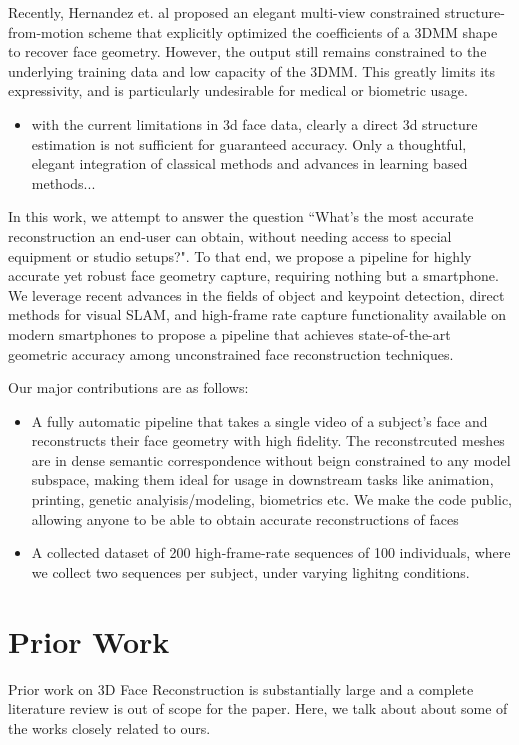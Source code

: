 \documentclass[10pt,twocolumn,letterpaper]{article}
\begin{document}
Recently, Hernandez et. al \cite{hernandez2017accurate} proposed an elegant multi-view constrained structure-from-motion scheme that explicitly optimized the coefficients of a 3DMM shape to recover face geometry. However, the output still remains constrained to the underlying training data and low capacity of the 3DMM. This greatly limits its expressivity, and is particularly undesirable for medical or biometric usage. 


\begin{itemize}
    \item with the current limitations in 3d face data, clearly a direct 3d structure estimation is not sufficient for guaranteed accuracy. Only a thoughtful, elegant integration of classical methods and advances in learning based methods...
\end{itemize}

In this work, we attempt to answer the question ``What's the most accurate reconstruction an end-user can obtain, without needing access to special equipment or studio setups?". To that end, we propose a pipeline for highly accurate yet robust face geometry capture, requiring nothing but a smartphone. We leverage recent advances in the fields of object and keypoint detection, direct methods for visual SLAM, and high-frame rate capture functionality available on modern smartphones to propose a pipeline that achieves state-of-the-art geometric accuracy among unconstrained face reconstruction techniques.

Our major contributions are as follows:
 \begin{itemize}
     \item  A fully automatic pipeline that takes a single video of a subject's face and reconstructs their face geometry with high fidelity. The reconstrcuted meshes are in dense semantic correspondence without beign constrained to any model subspace, making them ideal for usage in downstream tasks like animation, printing, genetic analyisis/modeling, biometrics etc. We make the code public, allowing anyone to be able to obtain accurate reconstructions of faces
     \item A collected dataset of 200 high-frame-rate  sequences of 100 individuals, where we collect two sequences per subject, under varying lighitng conditions.
 \end{itemize}

\section{Prior Work}
Prior work on 3D Face Reconstruction is substantially large and a complete literature review is out of scope for the paper. Here, we talk about about some of the works closely related to ours.
\end{document}
